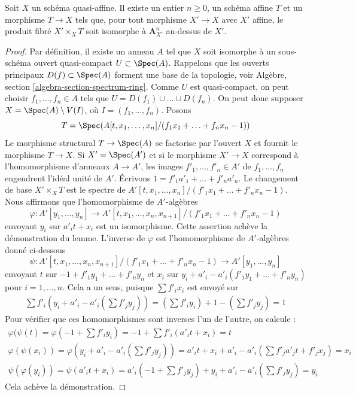 \begin{lemma}
\label{lemma-quasi-affine-presentation}
Soit $X$ un schéma quasi-affine. Il existe un entier $n \geq 0$,
un schéma affine $T$ et un morphisme $T \to X$ tels que, pour tout
morphisme $X' \to X$ avec $X'$ affine, le produit fibré $X' \times_X T$
soit isomorphe à $\mathbf{A}^n_{X'}$ au-dessus de $X'$.
\end{lemma}

\begin{proof}
Par définition, il existe un anneau $A$ tel que $X$ soit isomorphe à un
sous-schéma ouvert quasi-compact $U \subset \Spec(A)$. Rappelons que les ouverts
principaux $D(f) \subset \Spec(A)$ forment une base de la topologie,
voir Algèbre, section \ref{algebra-section-spectrum-ring}. Comme $U$ est
quasi-compact, on peut choisir $f_1, \ldots, f_n \in A$ tels que
$U = D(f_1) \cup \ldots \cup D(f_n)$. On peut donc supposer
$X = \Spec(A) \setminus V(I)$, où $I = (f_1, \ldots, f_n)$. Posons
$$
T = \Spec(A[t, x_1, \ldots, x_n]/(f_1 x_1 + \ldots + f_n x_n - 1))
$$
Le morphisme structural $T \to \Spec(A)$ se factorise par l'ouvert $X$
et fournit le morphisme $T \to X$. Si $X' = \Spec(A')$ et si le morphisme
$X' \to X$ correspond à l'homomorphisme d'anneaux $A \to A'$, les images
$f'_1, \ldots, f'_n \in A'$ de $f_1, \ldots, f_n$
engendrent l'idéal unité de $A'$.
Écrivons $1 = f'_1 a'_1 + \ldots + f'_n a'_n$.
Le changement de base $X' \times_X T$ est le spectre de
$A'[t, x_1, \ldots, x_n]/(f'_1 x_1 + \ldots + f'_n x_n - 1)$.
Nous affirmons que l'homomorphisme de $A'$-algèbres
$$
\varphi :
A'[y_1, \ldots, y_n]
\longrightarrow
A'[t, x_1, \ldots, x_n, x_{n + 1}]/(f'_1 x_1 + \ldots + f'_n x_n - 1)
$$
envoyant $y_i$ sur $a'_i t + x_i$ est un isomorphisme. Cette assertion  
achève la démonstration du lemme. L'inverse de $\varphi$ est l'homomorphisme de $A'$-algèbres donné
ci-dessous
$$
\psi :
A'[t, x_1, \ldots, x_n, x_{n + 1}]/(f'_1 x_1 + \ldots + f'_n x_n - 1)
\longrightarrow
A'[y_1, \ldots, y_n]
$$
envoyant $t$ sur $-1 + f'_1 y_1 + \ldots + f'_n y_n$ et $x_i$ sur
$y_i + a'_i - a'_i(f'_1 y_1 + \ldots + f'_n y_n)$ pour $i = 1, \ldots, n$.
Cela a un sens, puisque $\sum f'_ix_i$ est envoyé sur
$$
\begin{matrix}
\sum f'_i(y_i + a'_i - a'_i(\sum f'_j y_j)) =
(\sum f'_iy_i) + 1 - (\sum f'_j y_j) = 1
\end{matrix}
$$
Pour vérifier que ces homomorphismes sont inverses l'un de l'autre, on calcule :
$$
\begin{matrix}
\varphi(\psi(t) = \varphi(-1 +  \sum f'_i y_i) =
-1 + \sum f'_i (a'_i t + x_i) = t \\
\varphi(\psi(x_i)) = \varphi(y_i + a'_i - a'_i(\sum f'_j y_j)) =
a'_i t + x_i + a'_i - a'_i(\sum f'_ja'_jt + f'_jx_j) = x_i \\
\psi(\varphi(y_i)) = \psi(a'_i t + x_i) =
a'_i(-1 + \sum f'_j y_j) + y_i + a'_i - a'_i(\sum f'_j y_j) = y_i
\end{matrix}
$$
Cela achève la démonstration.
\end{proof}




